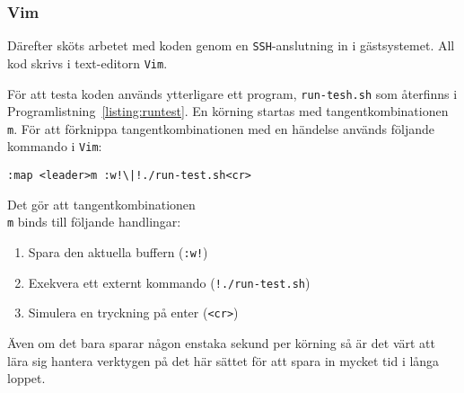 \subsubsection{Vim}
Därefter sköts arbetet med koden genom en \texttt{SSH}-anslutning in i
gästsystemet.  All kod skrivs i text-editorn \texttt{Vim}. 

För att testa koden används ytterligare ett program, \texttt{run-tesh.sh} som
återfinns i Programlistning~\ref{listing:runtest}.  En körning startas med
tangentkombinationen \texttt{\\ m}.  För att förknippa tangentkombinationen med
en händelse används följande kommando i \texttt{Vim}:

\begin{verbatim}
:map <leader>m :w!\|!./run-test.sh<cr>
\end{verbatim}

Det gör att tangentkombinationen \texttt{\\ m} binds till följande handlingar:
\begin{enumerate} 
  \item Spara den aktuella buffern (\texttt{:w!}) 
  \item Exekvera ett externt kommando (\texttt{!./run-test.sh})
  \item Simulera en tryckning på enter (\texttt{<cr>})
\end{enumerate} 

Även om det bara sparar någon enstaka sekund per körning så är det värt att
lära sig hantera verktygen på det här sättet för att spara in mycket tid i
långa loppet.
